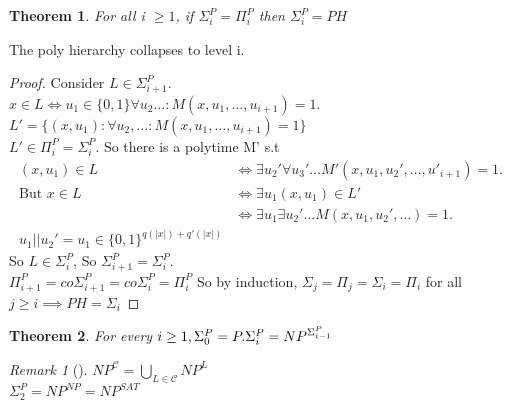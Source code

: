 \documentclass{article}
\newtheorem{theorem}{Theorem}
\theoremstyle{definition}
\theoremstyle{remark}
\newtheorem*{remark}{Remark}
\newcommand{\Rem}[3]{\begin{remark}[#1]\label{#2}#3\end{remark}}
\begin{document}
\begin{theorem}
	For all i $\geq 1$, if $\Sigma_{i}^{P} = \Pi_{i}^{P}$ then $\Sigma_{i}^{P} = PH$
\end{theorem}
The poly hierarchy collapses to level i.
\begin{proof}
	Consider $L \in \Sigma_{i+1}^{P}$.\\
	$x \in L \Leftrightarrow u_1 \in \{0,1\} \forall u_2 \dots : M(x,u_1,\dots,u_{i+1}) = 1$.\\
	$L' = \{(x,u_1): \forall u_2, \dots:M(x,u_1,\dots,u_{i+1}) = 1\}$\\
	$L' \in \Pi_i^P = \Sigma_i^P$. So there is a polytime M' s.t
	\begin{align*}
		(x,u_1)\in L & \Leftrightarrow  \exists u_2'\forall u_3'\dots M'(x,u_1,u_2',\dots,u'_{i+1}) = 1.\\
		\text{But } x\in L & \Leftrightarrow  \exists u_1 (x,u_1) \in L'\\
		& \Leftrightarrow \exists u_1 \exists u_2' \dots M(x,u_1,u_2',\dots) = 1.\\
		u_1||u_2' = u_1 \in \{0,1\}^{q(|x|)+q'(|x|)}
	\end{align*}
	So $L \in \Sigma_i^P$, So $\Sigma_{i+1}^P = \Sigma_i^P$.\\
	$\Pi_{i+1}^P = co\Sigma_{i+1}^P = co\Sigma_i^P = \Pi_i^P$
	So by induction, $\Sigma_j = \Pi_j = \Sigma_i = \Pi_i$ for all $j \geq i \implies PH = \Sigma_i$
\end{proof}

\begin{theorem}
	For every $i \geq 1, \Sigma_0^P = P.\\
	\Sigma_i^P = NP^{\Sigma_{i-1}^P}$
\end{theorem}

\Rem{}{}{$NP^{\mathcal{C}} = \bigcup\limits_{L\in\mathcal{C}} NP^L$\\
	$\Sigma_2^P = NP^{NP}= NP^{SAT}$}
\end{document}
